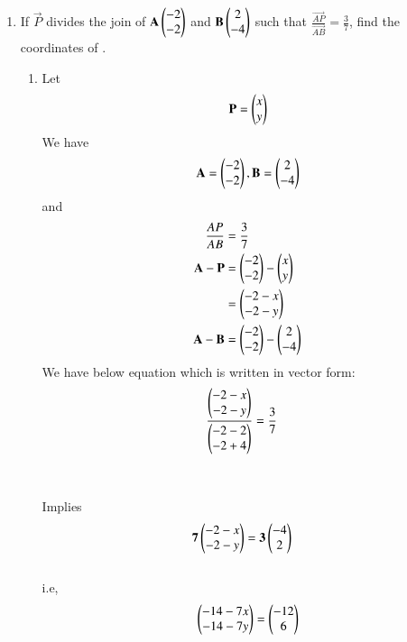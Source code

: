 \documentclass[journal,12pt,twocolumn]{IEEEtran}
\renewcommand\thesection{\arabic{section}}
\begin{document}
\begin{enumerate}[label=\thesection.\arabic*.,ref=\thesection.\theenumi]
\item If $\vec{P}$ divides the join of $\mathbf{A}\begin{pmatrix}-2\\-2\end{pmatrix}$ and $\mathbf{B}\begin{pmatrix}2\\-4\end{pmatrix}$ such that $\frac{\vec{AP}}{\vec{AB}} = \frac{3}{7}$, find the coordinates of .
\\
\solution\begin{enumerate}
    \item Let 
    \begin{align}
     \mathbf{P}=\begin{pmatrix}x\\y\end{pmatrix}   
    \end{align}
    We have \begin{align}
    \mathbf{A}=\begin{pmatrix}-2\\-2\end{pmatrix},
    \mathbf{B}=\begin{pmatrix}2\\-4\end{pmatrix}
    \end{align}
    and
    \begin{align}
        \frac{AP}{AB} &= \frac{3}{7}\\
        \mathbf{A}-\mathbf{P}&=\begin{pmatrix}-2\\-2\end{pmatrix} -\begin{pmatrix}x\\y\end{pmatrix}\\&=\begin{pmatrix}-2-x\\-2-y\end{pmatrix}\\
        \mathbf{A}-\mathbf{B} &=\begin{pmatrix}-2\\-2\end{pmatrix} - \begin{pmatrix}2\\-4\end{pmatrix}\\
    \end{align}
        We have below equation which is written in vector form:
    \begin{align}
       \frac{\begin{pmatrix}-2-x \\ -2-y\end{pmatrix}}{\begin{pmatrix}-2-2 \\ -2+4\end{pmatrix}} &= \frac{3}{7}
    \end{align}\\
    \\Implies
    \begin{align}
        \mathbf{7}\begin{pmatrix}-2-x \\ -2-y\end{pmatrix} &= \mathbf{3}\begin{pmatrix}-4 \\ 2\end{pmatrix}
    \end{align}
\\i.e, \begin{align}
        \begin{pmatrix}-14-7x \\ -14-7y\end{pmatrix}=\begin{pmatrix}-12 \\ 6\end{pmatrix}
    \end{align}


\end{enumerate}
\end{enumerate}
\end{document}
